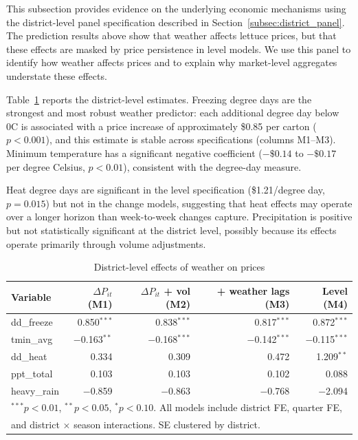 \documentclass[12pt]{article}
\begin{document}
This subsection provides evidence on the underlying economic mechanisms using the district-level panel specification described in Section~\ref{subsec:district_panel}. The prediction results above show that weather affects lettuce prices, but that these effects are masked by price persistence in level models. We use this panel to identify how weather affects prices and to explain why market-level aggregates understate these effects.

Table~\ref{tab:district_weather} reports the district-level estimates. Freezing degree days are the strongest and most robust weather predictor: each additional degree day below 0\textdegree C is associated with a price increase of approximately \$0.85 per carton ($p < 0.001$), and this estimate is stable across specifications (columns M1--M3). Minimum temperature has a significant negative coefficient ($-\$0.14$ to $-\$0.17$ per degree Celsius, $p < 0.01$), consistent with the degree-day measure.

Heat degree days are significant in the level specification (\$1.21/degree day, $p = 0.015$) but not in the change models, suggesting that heat effects may operate over a longer horizon than week-to-week changes capture. Precipitation is positive but not statistically significant at the district level, possibly because its effects operate primarily through volume adjustments.

\begin{table}[!htbp]
\centering
\caption{District-level effects of weather on prices}
\label{tab:district_weather}
\begin{tabular}{lrrrr}
\toprule
Variable & $\Delta P_{it}$ (M1) & $\Delta P_{it}$ + vol (M2) & + weather lags (M3) & Level (M4) \\
\midrule
dd\_freeze & 0.850$^{***}$ & 0.838$^{***}$ & 0.817$^{***}$ & 0.872$^{***}$ \\
tmin\_avg & $-$0.163$^{**}$ & $-$0.168$^{***}$ & $-$0.142$^{***}$ & $-$0.115$^{***}$ \\
dd\_heat & 0.334 & 0.309 & 0.472 & 1.209$^{**}$ \\
ppt\_total & 0.103 & 0.103 & 0.102 & 0.088 \\
heavy\_rain & $-$0.859 & $-$0.863 & $-$0.768 & $-$2.094 \\
\bottomrule
\multicolumn{5}{l}{\footnotesize $^{***}p<0.01$, $^{**}p<0.05$, $^{*}p<0.10$. All models include district FE, quarter FE,} \\
\multicolumn{5}{l}{\footnotesize and district $\times$ season interactions. SE clustered by district.} \\
\end{tabular}
\end{table}
\end{document}
